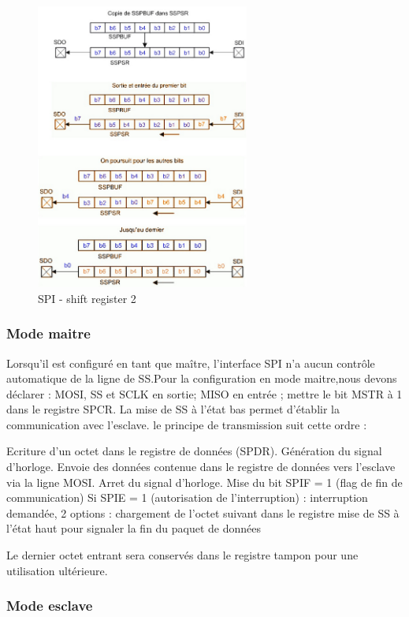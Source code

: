 \documentclass[french,a4paper,12pt]{report}
\begin{document}
	\begin{figure}[!ht]
    \center
  	\includegraphics[width=7cm]{SPI4.png}
    \caption{SPI - shift register 2}
	\end{figure}
 
  		\subsubsection{Mode maitre}
  		
  		Lorsqu'il est configuré en tant que maître, l'interface SPI n'a aucun contrôle automatique de la ligne de SS.Pour la configuration en mode maitre,nous devons déclarer : MOSI, SS et SCLK en sortie; MISO en entrée ; mettre le bit MSTR à 1 dans le registre SPCR. La mise de SS à l’état bas permet
d'établir la communication avec l’esclave.
le principe de transmission suit cette ordre :
 
    Ecriture d’un octet dans le registre de données (SPDR).
    Génération du signal d'horloge.
    Envoie des données contenue dans le registre de données vers l’esclave via la ligne MOSI.
    Arret du signal d'horloge.
    Mise du bit SPIF = 1 (flag de fin de communication)
    Si SPIE = 1 (autorisation de l’interruption) : interruption demandée, 2 options :
        chargement de l’octet suivant dans le registre
        mise de SS à l’état haut pour signaler la fin du paquet de données
 
	Le dernier octet entrant sera conservés dans le registre tampon pour une utilisation ultérieure.
 
  		\subsubsection{Mode esclave}
  		
\end{document}

